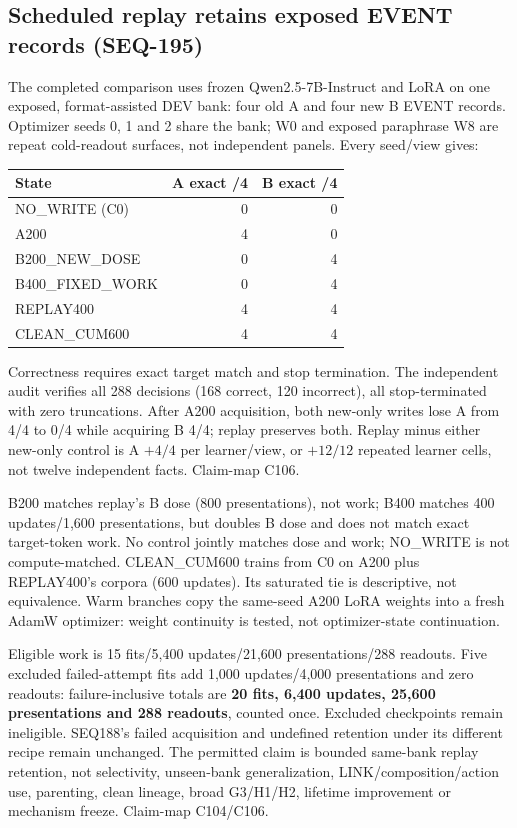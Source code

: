 \documentclass{article}
\begin{document}
\subsection{Scheduled replay retains exposed EVENT records (SEQ-195)}
\label{sec:seq195}
The completed comparison uses frozen Qwen2.5-7B-Instruct and LoRA on one
exposed, format-assisted DEV bank: four old A and four new B EVENT records.
Optimizer seeds 0, 1 and 2 share the bank; W0 and exposed paraphrase W8 are
repeat cold-readout surfaces, not independent panels. Every seed/view gives:
\begin{center}
\begin{tabular}{lrr}
\toprule
State & A exact /4 & B exact /4 \\
\midrule
NO\_WRITE (C0) & 0 & 0 \\
A200 & 4 & 0 \\
B200\_NEW\_DOSE & 0 & 4 \\
B400\_FIXED\_WORK & 0 & 4 \\
REPLAY400 & 4 & 4 \\
CLEAN\_CUM600 & 4 & 4 \\
\bottomrule
\end{tabular}
\end{center}
Correctness requires exact target match and stop termination. The independent
audit verifies all 288 decisions (168 correct, 120 incorrect), all
stop-terminated with zero truncations. After A200 acquisition, both new-only
writes lose A from 4/4 to 0/4 while acquiring B 4/4; replay preserves both.
Replay minus either new-only control is A $+4/4$ per learner/view, or
$+12/12$ repeated learner cells, not twelve independent facts. Claim-map C106.

B200 matches replay's B dose (800 presentations), not work; B400 matches
400 updates/1,600 presentations, but doubles B dose and does not match exact
target-token work. No control jointly matches dose and work; NO\_WRITE is
not compute-matched. CLEAN\_CUM600 trains from C0 on A200 plus REPLAY400's
corpora (600 updates). Its saturated tie is descriptive, not equivalence.
Warm branches copy the same-seed A200 LoRA weights into a fresh AdamW
optimizer: weight continuity is tested, not optimizer-state continuation.

Eligible work is 15 fits/5,400 updates/21,600 presentations/288 readouts.
Five excluded failed-attempt fits add 1,000 updates/4,000 presentations and
zero readouts: failure-inclusive totals are \textbf{20 fits, 6,400 updates,
25,600 presentations and 288 readouts}, counted once. Excluded checkpoints
remain ineligible. SEQ188's failed acquisition and undefined retention under
its different recipe remain unchanged. The permitted claim is bounded
same-bank replay retention, not selectivity, unseen-bank generalization,
LINK/composition/action use, parenting, clean lineage, broad G3/H1/H2,
lifetime improvement or mechanism freeze. Claim-map C104/C106.
\end{document}
